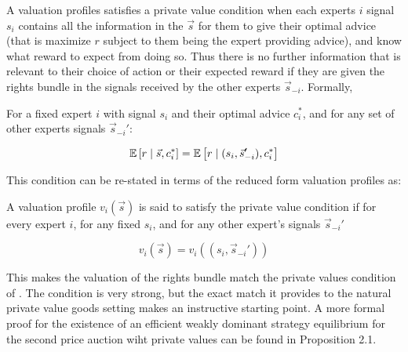 A valuation profiles satisfies a private value condition when each experts $i$ signal $s_{i}$ contains all the information in the $\vec{s}$ for them to give their optimal advice (that is maximize $r$ subject to them being the expert providing advice), and know what reward to expect from doing so. Thus there is no further information that is relevant to their choice of action or their expected reward if they are given the rights bundle in the signals received by the other experts  $\vec{s}_{-i}$. Formally,

\begin{defn}\label{PrivateCondition}

For a fixed expert $i$ with signal $s_i$ and their optimal advice $c^*_i$, and for any set of other experts  signals $\vec{s}_{-i}'$:

$$ \operatorname*{\mathbb E} \left[r \mid \vec{s}, c^*_i \right]
=
\operatorname*{\mathbb E} \left[r \mid (s_i,\vec{s}_{-i}'), c^*_i \right]
$$

This condition can be re-stated in terms of the reduced form valuation profiles as:

A valuation profile $v_i(\vec{s})$ is said to satisfy the private value condition if for every expert $i$, for any fixed $s_i$, and for any other expert's  signals $\vec{s}_{-i}'$
	
	$$ v_i(\vec{s}) = v_i((s_i, \vec{s}_{-i}')) $$
\end{defn}

This makes the valuation of the rights bundle match the private values condition of \citet{vickrey1961}. The condition is very strong, but the exact match it provides to the natural private value goods setting makes an instructive starting point.
A more formal proof for the existence of an efficient weakly dominant strategy equilibrium for the second price auction wiht private values can be found in \citet{krishna2009auction} Proposition 2.1.


